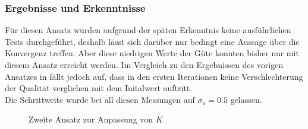 \documentclass[../Report.tex]{subfiles}
\begin{document}
\subsubsection*{Ergebnisse und Erkenntnisse}
\label{subsubsec:opt.adjusta.kleiner.results}
Für diesen Ansatz wurden aufgrund der späten Erkenntnis keine ausführlichen Tests durchgeführt, deshalb lässt sich darüber nur bedingt eine Aussage über die Konvergenz treffen. Aber diese niedrigen Werte der Güte konnten bisher nur mit diesem Ansatz erreicht werden. Im Vergleich zu den Ergebnissen des vorigen Ansatzes in  fällt jedoch auf, dass in den ersten Iterationen keine Verschlechterung der Qualität verglichen mit dem Initalwert auftritt.
\\
Die Schrittweite wurde bei all diesen Messungen auf $\sigma_a = 0.5$ gelassen.
\begin{figure}[H]
\begin{subfigure}{0.5 \textwidth}
	\setlength\figureheight{8cm}
	\setlength\figurewidth{8cm}
    
	\label{fig:opt.kleinerBereich.K}
\end{subfigure}
\begin{subfigure}{0.5 \textwidth}
	\setlength\figureheight{8cm}
	\setlength\figurewidth{8cm}
    
	\label{fig:opt.kleinerBereich.Q}
\end{subfigure}
\label{fig:opt.Kennlinie}
\caption{Zweite Ansatz zur Anpassung von $K$}
\end{figure}
\end{document}
